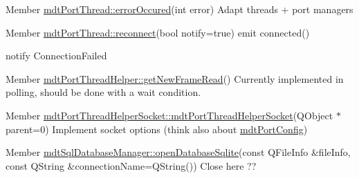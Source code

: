 \label{todo__todo000049}
\hypertarget{todo__todo000049}{}
 
\begin{DoxyDescription}
\item[Member \hyperlink{classmdt_port_thread_ab31cbe1a85aa830cd368654d1f806326}{mdtPortThread::errorOccured}(int error) ]Adapt threads + port managers
\end{DoxyDescription}

\label{todo__todo000047}
\hypertarget{todo__todo000047}{}
 
\begin{DoxyDescription}
\item[Member \hyperlink{classmdt_port_thread_abee1d2f9b67ca37cfd13e108ca978b36}{mdtPortThread::reconnect}(bool notify=true) ]emit connected() 

notify ConnectionFailed 
\end{DoxyDescription}

\label{todo__todo000050}
\hypertarget{todo__todo000050}{}
 
\begin{DoxyDescription}
\item[Member \hyperlink{classmdt_port_thread_helper_aed853f4cedc143c62e7dad5e38ff4b8c}{mdtPortThreadHelper::getNewFrameRead}() ]Currently implemented in polling, should be done with a wait condition.
\end{DoxyDescription}

\label{todo__todo000051}
\hypertarget{todo__todo000051}{}
 
\begin{DoxyDescription}
\item[Member \hyperlink{classmdt_port_thread_helper_socket_aa77afb8d26e4863bd437e0d59efae7a7}{mdtPortThreadHelperSocket::mdtPortThreadHelperSocket}(QObject $\ast$parent=0) ]Implement socket options (think also about \hyperlink{classmdt_port_config}{mdtPortConfig}) 
\end{DoxyDescription}

\label{todo__todo000084}
\hypertarget{todo__todo000084}{}
 
\begin{DoxyDescription}
\item[Member \hyperlink{classmdt_sql_database_manager_a336b722f66e13c5c9b09575642f7b273}{mdtSqlDatabaseManager::openDatabaseSqlite}(const QFileInfo \&fileInfo, const QString \&connectionName=QString()) ]Close here ?? 
\end{DoxyDescription}

\label{todo__todo000001}
\hypertarget{todo__todo000001}{}
 
